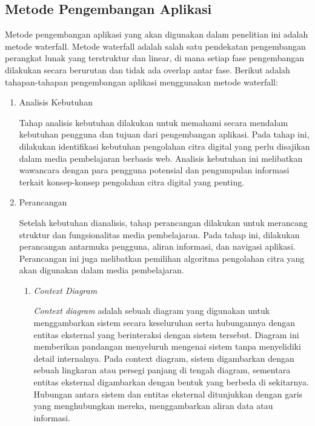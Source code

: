 \subsection{Metode Pengembangan Aplikasi}
Metode pengembangan aplikasi yang akan digunakan dalam penelitian ini adalah metode waterfall. Metode waterfall adalah salah satu pendekatan pengembangan perangkat lunak yang terstruktur dan linear, di mana setiap fase pengembangan dilakukan secara berurutan dan tidak ada overlap antar fase. Berikut adalah tahapan-tahapan pengembangan aplikasi menggunakan metode waterfall:

\begin{enumerate}[leftmargin=1cm, itemindent=0.6cm,labelwidth=15pt, labelsep=5pt, listparindent=1cm,align=left]

    \item Analisis Kebutuhan

    Tahap analisis kebutuhan dilakukan untuk memahami secara mendalam kebutuhan pengguna dan tujuan dari pengembangan aplikasi. Pada tahap ini, dilakukan identifikasi kebutuhan pengolahan citra digital yang perlu disajikan dalam media pembelajaran berbasis web. Analisis kebutuhan ini melibatkan wawancara dengan para pengguna potensial dan pengumpulan informasi terkait konsep-konsep pengolahan citra digital yang penting.

    \item Perancangan

    Setelah kebutuhan dianalisis, tahap perancangan dilakukan untuk merancang struktur dan fungsionalitas media pembelajaran. Pada tahap ini, dilakukan perancangan antarmuka pengguna, aliran informasi, dan navigasi aplikasi. Perancangan ini juga melibatkan pemilihan algoritma pengolahan citra yang akan digunakan dalam media pembelajaran.

\begin{enumerate}[leftmargin=1cm, itemindent=0.6cm,labelwidth=15pt, labelsep=5pt, listparindent=1cm,align=left]

\item\textit{Context Diagram}

\textit{Context diagram} adalah sebuah diagram yang digunakan untuk menggambarkan sistem secara keseluruhan serta hubungannya dengan entitas eksternal yang berinteraksi dengan sistem tersebut. Diagram ini memberikan pandangan menyeluruh mengenai sistem tanpa menyelidiki detail internalnya. Pada context diagram, sistem digambarkan dengan sebuah lingkaran atau persegi panjang di tengah diagram, sementara entitas eksternal digambarkan dengan bentuk yang berbeda di sekitarnya. Hubungan antara sistem dan entitas eksternal ditunjukkan dengan garis yang menghubungkan mereka, menggambarkan aliran data atau informasi.


\end{enumerate}
\end{enumerate}
